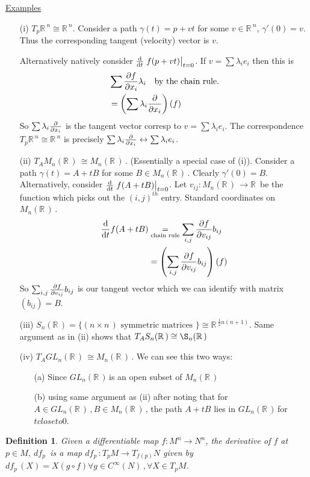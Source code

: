 \documentclass[12pt,a4paper]{article}
\newcommand{\rR}{\ensuremath{\mathbb{R}\,}}
\newcommand{\nn}{\ensuremath{n \times n\,}}
\newcommand{\cinfn}[1]{\ensuremath{C^{\infty}(#1)\,}}
\newcommand{\tpm}{\ensuremath{T_p M}}
\newcommand{\tqn}[2]{\ensuremath{T_{#1} {#2}}}
\newcommand{\dfp}{\ensuremath{df_p \,}}
\newcommand{\mnr}{\ensuremath{M_n(\rR)\,}}
\newcommand{\glnr}{\ensuremath{GL_n(\rR)\,}}
\newcommand{\ul}[1]{\underline{#1}}
\newtheorem{defn}[thm]{Definition}
\begin{document}
\ul{Examples}
\begin{itemize}
\item[(i)] $\tqn{p}{\rR^n}\cong \rR^n$. Consider a path $\gamma(t)=p+vt$ for some $v\in \rR^n$, $\gamma'(0)=v$. Thus the corresponding tangent (velocity) vector is $v$. 

Alternatively natively consider $\dv{t}\eval{f(p+vt)}_{t=0}$. If $v=\sum \lambda_i e_i$ then this is 
\begin{align*}
&\sum \pdv{f}{x_i}\lambda_i \quad \text{by the chain rule.}\\
&=\left(\sum \lambda_i \pdv{x_i}\right)(f)
\end{align*}
So $\sum \lambda_i \pdv{x_i}$ is the tangent vector corresp to $v=\sum \lambda_i e_i$. The correspondence $\tqn{p}{\rR^n}\cong \rR^n$ is precisely $\sum \lambda_i \pdv{x_i} \leftrightarrow \sum \lambda_i e_i$.

\item[(ii)] $\tqn{A}{\mnr} \cong \mnr$. (Essentially a special case of (i)). Consider a path $\gamma(t)=A+tB$ for some $B\in \mnr$. Clearly $\gamma'(0)=B$. Alternatively, consider $\dv{t}\eval{f(A+tB)}_{t=0}$. Let $v_{ij}:\mnr \to \rR$ be the function which picks out the $(i,j)^{th}$ entry. Standard coordinates on \mnr.
\begin{align*}
\dv{t}f(A+tB)&\underset{\text{chain rule}}{=}\sum_{i,j} \pdv{f}{v_{ij}}b_{ij}\\
&=\left(\sum_{i,j}\pdv{f}{v_{ij}}b_{ij}\right)(f)
\end{align*}
So $\sum_{i,j}\pdv{f}{v_{ij}}b_{ij}$ is our tangent vector which we can identify with matrix $(b_{ij})=B$.

\item[(iii)]  $S_n(\rR)=\{(\nn) \text{ symmetric matrices }\}\cong \rR^{\frac{1}{2}n(n+1)}$. Same argument as in (ii) shows that $\tqn{A}{S_n(\rR)}\cong \S_n(\rR)$
\item[(iv)]  $\tqn{A}{\glnr}\cong \mnr$. We can see this two ways:
\begin{itemize}
\item[(a)] Since \glnr is an open subset of \mnr
\item[(b)] using same argument as (ii) after noting that for $A\in \glnr, B\in \mnr$, the path $A+tB$ lies in \glnr for $t close to 0$.
\end{itemize}
\end{itemize}

\begin{defn}
Given a differentiable map $f:M^n\to N^n$, the derivative of $f$ at $p\in M$, $\dfp$ is a map $\dfp:\tpm\to\tqn{f(p)}{N}$ given by $\dfp(X)=X(g\circ f) \forall g\in \cinfn{N}, \forall X\in \tpm$.
\end{defn}
\end{document}
